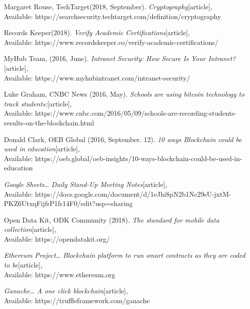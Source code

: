 \begin{thebibliography}{10}

Margaret Rouse, TechTarget(2018, September).
\emph{Cryptography}[article],\\
Available: {https://searchsecurity.techtarget.com/definition/cryptography}

 Records Keeper(2018).
\emph{Verify Academic Certifications}[article],\\
Available: {https://www.recordskeeper.co/verify-academic-certifications/}


MyHub Team, (2016, June).
\emph{Intranet Security: How Secure Is Your Intranet?}[article],\\
Available: {https://www.myhubintranet.com/intranet-security/}

Luke Graham, CNBC News (2016, May).
\emph{Schools are using bitcoin technology to track students:}[article],\\
Available: {https://www.cnbc.com/2016/05/09/schools-are-recording-students-results-on-the-blockchain.html}

Donald Clark, OEB Global (2016, September. 12).
\emph{10 ways Blockchain could be used in education}[article],\\
Available: {https://oeb.global/oeb-insights/10-ways-blockchain-could-be-used-in-education}

\emph{Google Sheets… Daily Stand-Up Meeting Notes}[article],\\
Available: {https://docs.google.com/document/d/1eJhi8pN2b1Nc29sU-jxtM-PKZ6UtxqFijfrP1fr14F0/edit?usp=sharing}

 Open Data Kit, ODK Community (2018).
\emph{The standard for mobile data collection}[article],\\
Available: {https://opendatakit.org/}


\emph{Ethereum Project… Blockchain platform to run smart contracts as they are coded to be}[article],\\
Available: {https://www.ethereum.org}

\emph{Ganache… A one click blockchain}[article],\\
Available: {https://truffleframework.com/ganache}



\end{thebibliography}

\newpage